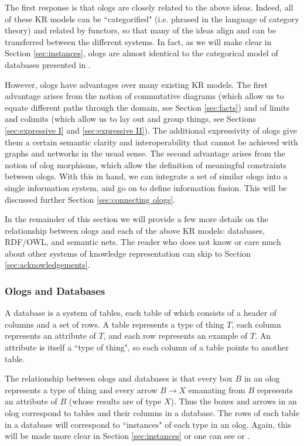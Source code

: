 \documentclass{amsart}
\def\to{\rightarrow}
\theoremstyle{remark}
\theoremstyle{definition}
\begin{document}
The first response is that ologs are closely related to the above ideas. Indeed, all of these  KR models can be ``categorified" (i.e. phrased in the language of category theory) and related by functors, so that many of the ideas align and can be transferred between the different systems. In fact, as we will make clear in Section \ref{sec:instances}, ologs are almost identical to the categorical model of databases presented in \cite{Spi-FDM}. 

However, ologs have advantages over many existing KR models. The first advantage arises from the notion of commutative diagrams (which allow us to equate different paths through the domain, see Section \ref{sec:facts}) and of limits and colimits (which allow us to lay out and group things, see Sections \ref{sec:expressive I} and \ref{sec:expressive II}). The additional expressivity of ologs give them a certain semantic clarity and interoperability that cannot be achieved with graphs and networks in the usual sense. 
The second advantage arises from the notion of olog morphisms, 
which allow the definition of meaningful constraints between ologs. With this in hand, we can integrate a set of similar ologs into a single information system, and go on to define information fusion. This will be discussed further Section \ref{sec:connecting ologs}.

In the remainder of this section we will provide a few more details on the relationship between ologs and each of the above KR models: databases, RDF/OWL, and semantic nets. The reader who does not know or care much about other systems of knowledge representation can skip to Section \ref{sec:acknowledgements}.

\subsubsection{Ologs and Databases}

A database is a system of tables, each table of which consists of a header of columns and a set of rows. A table represents a type of thing $T$, each column represents an attribute of $T$, and each row represents an example of $T$. An attribute is itself a ``type of thing", so each column of a table points to another table. 

The relationship between ologs and databases is that every box $B$ in an olog represents a type of thing and every arrow $B\to X$ emanating from $B$ represents an attribute of $B$ (whose results are of type $X$). Thus the boxes and arrows in an olog correspond to tables and their columns in a database. The rows of each table in a database will correspond to ``instances" of each type in an olog. Again, this will be made more clear in Section \ref{sec:instances} or one can see \cite{Spi-FDM} or \cite{K:DBS}. 
\end{document}
